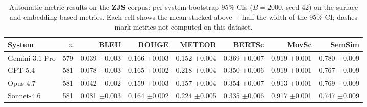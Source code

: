 \begin{table}[t]
\centering\footnotesize
\caption{Automatic-metric results on the \textbf{ZJS} corpus: per-system bootstrap 95\% CIs ($B=2000$, seed $42$) on the surface and embedding-based metrics. Each cell shows the mean stacked above $\pm$ half the width of the 95\% CI; dashes mark metrics not computed on this dataset.}
\label{tbl-full-results-auto-zjs}
\setlength{\tabcolsep}{4pt}
\begin{tabular*}{\textwidth}{@{\extracolsep{\fill}}lrrrrrrr@{}}
\toprule
System & $n$ & BLEU & ROUGE & METEOR & BERTSc & MovSc & SemSim \\
\midrule
Gemini-3.1-Pro & 579 & \shortstack[r]{0.039\\{\scriptsize $\pm$0.003}} & \shortstack[r]{0.166\\{\scriptsize $\pm$0.003}} & \shortstack[r]{0.152\\{\scriptsize $\pm$0.004}} & \shortstack[r]{0.369\\{\scriptsize $\pm$0.007}} & \shortstack[r]{0.919\\{\scriptsize $\pm$0.001}} & \shortstack[r]{0.780\\{\scriptsize $\pm$0.009}} \\
GPT-5.4 & 581 & \shortstack[r]{0.078\\{\scriptsize $\pm$0.003}} & \shortstack[r]{0.165\\{\scriptsize $\pm$0.002}} & \shortstack[r]{0.218\\{\scriptsize $\pm$0.004}} & \shortstack[r]{0.350\\{\scriptsize $\pm$0.006}} & \shortstack[r]{0.919\\{\scriptsize $\pm$0.001}} & \shortstack[r]{0.767\\{\scriptsize $\pm$0.009}} \\
Opus-4.7 & 581 & \shortstack[r]{0.042\\{\scriptsize $\pm$0.002}} & \shortstack[r]{0.159\\{\scriptsize $\pm$0.003}} & \shortstack[r]{0.157\\{\scriptsize $\pm$0.004}} & \shortstack[r]{0.354\\{\scriptsize $\pm$0.007}} & \shortstack[r]{0.913\\{\scriptsize $\pm$0.001}} & \shortstack[r]{0.769\\{\scriptsize $\pm$0.009}} \\
Sonnet-4.6 & 581 & \shortstack[r]{0.081\\{\scriptsize $\pm$0.003}} & \shortstack[r]{0.164\\{\scriptsize $\pm$0.002}} & \shortstack[r]{0.224\\{\scriptsize $\pm$0.005}} & \shortstack[r]{0.335\\{\scriptsize $\pm$0.006}} & \shortstack[r]{0.917\\{\scriptsize $\pm$0.001}} & \shortstack[r]{0.747\\{\scriptsize $\pm$0.009}} \\

\end{tabular*}
\end{table}
